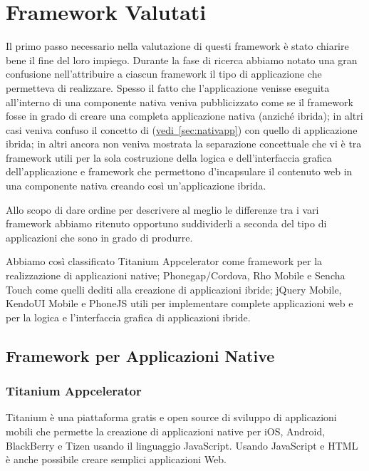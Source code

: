 \chapter{Framework Valutati}
	Il primo passo necessario nella valutazione di questi framework è stato 
	chiarire bene il fine del loro impiego. Durante la fase di ricerca abbiamo 
	notato una gran confusione nell'attribuire a ciascun framework il tipo di
	applicazione che permetteva di realizzare. Spesso il fatto che 
	l'applicazione venisse eseguita all'interno di una componente nativa veniva 
	pubblicizzato come se il framework fosse in grado di creare una completa 
	applicazione nativa (anziché ibrida); in altri casi 
	veniva confuso il concetto di 
	\crosscomp (\hyperref[sec:nativapp]{vedi~\ref{sec:nativapp}}) con
	quello di applicazione ibrida; in altri ancora non veniva mostrata la
	separazione concettuale che vi è tra framework utili per la sola costruzione
	della logica e dell'interfaccia grafica dell'applicazione e framework che 
	permettono d'incapsulare il contenuto web in una componente nativa creando 
	così un'applicazione ibrida.
	
	Allo scopo di dare ordine per descrivere al meglio le differenze tra i vari 
	framework abbiamo ritenuto opportuno suddividerli a seconda del tipo di 
	applicazioni che sono in grado di produrre.
	
	Abbiamo così classificato Titanium Appcelerator come framework per la 
	realizzazione di applicazioni native; Phonegap/Cordova, Rho Mobile e Sencha 
	Touch come quelli dediti alla creazione di applicazioni ibride; jQuery 
	Mobile, KendoUI Mobile e PhoneJS utili per implementare complete 
	applicazioni web e per la logica e l'interfaccia grafica di applicazioni 
	ibride.

	\section{Framework per Applicazioni Native}
		
		\subsection{Titanium Appcelerator}
		\label{sec:titanium}
			Titanium è una piattaforma gratis e open source di sviluppo di 
			applicazioni mobili che permette la creazione di applicazioni native
			\crossplat per iOS, Android, BlackBerry e Tizen usando il 
			linguaggio JavaScript. Usando JavaScript e HTML è anche possibile
			creare semplici applicazioni Web.
			
